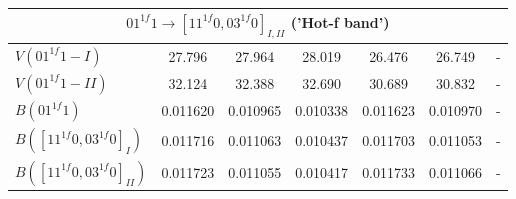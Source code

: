 \documentclass{report}
\begin{document}
\begin{appendices}
\begin{table}
\begin{tabular}{|l|cccccc|}
\hline
\multicolumn{7}{|c|}{$01^{1f}1\rightarrow[11^{1f}0,03^{1f}0]_{I,II}$ ('Hot-f band')}\\
\hline
$V(01^{1f}1-I)$               & 27.796 & 27.964 & 28.019 & 26.476 & 26.749 & -\\
$V(01^{1f}1-II)$              & 32.124 & 32.388 & 32.690 & 30.689 & 30.832 & -\\
$B(01^{1f}1)$                 & 0.011620 & 0.010965 & 0.010338 & 0.011623 & 0.010970 & -\\
$B([11^{1f}0,03^{1f}0]_I)$    & 0.011716 & 0.011063 & 0.010437 & 0.011703 & 0.011053 & -\\
$B([11^{1f}0,03^{1f}0]_{II})$ & 0.011723 & 0.011055 & 0.010417 & 0.011733 & 0.011066 & -\\
\hline
\end{tabular}
\end{table}


\end{appendices}
\end{document}

